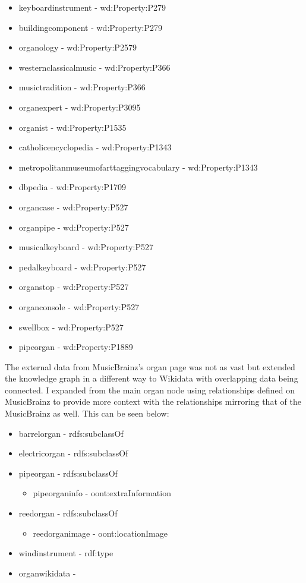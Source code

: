 \begin{itemize}
    \itemsep0em 
    \item keyboardinstrument - wd:Property:P279
    \item buildingcomponent - wd:Property:P279
    \item organology - wd:Property:P2579 
    \item westernclassicalmusic - wd:Property:P366
    \item musictradition - wd:Property:P366
    \item organexpert - wd:Property:P3095
    \item organist - wd:Property:P1535
    \item catholicencyclopedia - wd:Property:P1343
    \item metropolitanmuseumofarttaggingvocabulary - wd:Property:P1343
    \item dbpedia - wd:Property:P1709
    \item organcase - wd:Property:P527
    \item organpipe - wd:Property:P527
    \item musicalkeyboard - wd:Property:P527
    \item pedalkeyboard - wd:Property:P527
    \item organstop - wd:Property:P527
    \item organconsole - wd:Property:P527
    \item swellbox - wd:Property:P527
    \item pipeorgan - wd:Property:P1889
\end{itemize}

The external data from MusicBrainz's organ page \cite{organmusicbrainz} was not as vast but extended the knowledge graph in a different way to Wikidata with overlapping data being connected. I expanded from the main organ node using relationships defined on MusicBrainz to provide more context with the relationships mirroring that of the MusicBrainz as well. This can be seen below:

\begin{itemize}
    \itemsep0em 
    \item barrelorgan - rdfs:subclassOf
    \item electricorgan - rdfs:subclassOf
    \item pipeorgan - rdfs:subclassOf
    \begin{itemize}
        \itemsep0em 
        \item pipeorganinfo - oont:extraInformation
    \end{itemize}
    \item reedorgan - rdfs:subclassOf
    \begin{itemize}
        \itemsep0em 
        \item reedorganimage - oont:locationImage
    \end{itemize}
    \item windinstrument - rdf:type
    \item organwikidata - 
\end{itemize}

